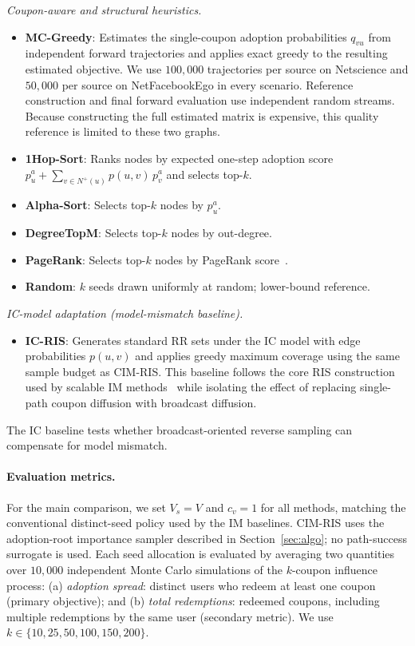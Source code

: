 \documentclass[sigconf,balance=false]{acmart}
\newcommand{\CIMRIS}{\textsc{CIM-RIS}}
\begin{document}
\noindent\textit{Coupon-aware and structural heuristics.}
\begin{itemize}[leftmargin=*]
  \item \textbf{MC-Greedy}: Estimates the single-coupon adoption
    probabilities $q_{vu}$ from independent forward trajectories and
    applies exact greedy to the resulting estimated objective.
    We use $100{,}000$ trajectories per source on Netscience and
    $50{,}000$ per source on NetFacebookEgo in every scenario.
    Reference construction and final forward evaluation use independent
    random streams. Because constructing the full estimated matrix is
    expensive, this quality reference is limited to these two graphs.
  \item \textbf{1Hop-Sort}: Ranks nodes by expected one-step adoption
    score $p_u^a + \sum_{v \in N^+(u)} p(u,v)\,p_v^a$ and selects
    top-$k$.
  \item \textbf{Alpha-Sort}: Selects top-$k$ nodes by $p_u^a$.
  \item \textbf{DegreeTopM}: Selects top-$k$ nodes by out-degree.
  \item \textbf{PageRank}: Selects top-$k$ nodes by PageRank
    score~\cite{page1999pagerank}.
  \item \textbf{Random}: $k$ seeds drawn uniformly at random;
    lower-bound reference.
\end{itemize}

\noindent\textit{IC-model adaptation (model-mismatch baseline).}
\begin{itemize}[leftmargin=*]
  \item \textbf{IC-RIS}: Generates standard RR sets under the IC model
    with edge probabilities $p(u,v)$ and applies greedy maximum coverage
    using the same sample budget as \CIMRIS{}.
    This baseline follows the core RIS construction used by scalable IM
    methods~\cite{borgs2014maximizing,tang2015influence} while isolating
    the effect of replacing single-path coupon diffusion with broadcast
    diffusion.
\end{itemize}

The IC baseline tests whether broadcast-oriented reverse sampling can
compensate for model mismatch.

\paragraph{Evaluation metrics.}
For the main comparison, we set $V_s=V$ and $c_v=1$ for all methods, matching
the conventional distinct-seed policy used by the IM baselines.
\CIMRIS{} uses the adoption-root importance sampler described in
Section~\ref{sec:algo}; no path-success surrogate is used.
Each seed allocation is evaluated by averaging two quantities over $10{,}000$
independent Monte Carlo simulations of the $k$-coupon influence process:
(a) \emph{adoption spread}: distinct users who redeem at least one coupon
(primary objective); and (b) \emph{total redemptions}: redeemed coupons,
including multiple redemptions by the same user (secondary metric).
We use $k\in\{10,25,50,100,150,200\}$.
\end{document}

